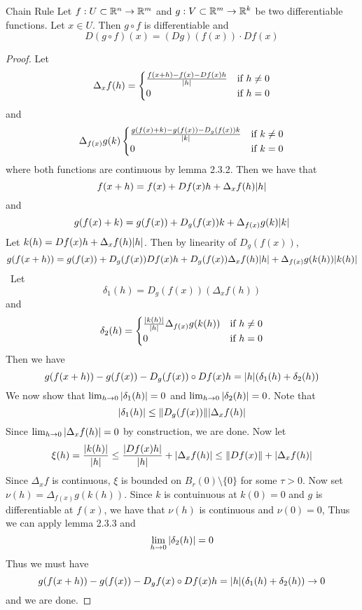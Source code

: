 \documentclass[a4paper]{article}
\begin{document}
\begin{prp}{Chain Rule}{} Let $f:U\subset\mathbb{R}^n\to\mathbb{R}^m$ and $g:V\subset\mathbb{R}^m\to\mathbb{R}^k$ be two differentiable functions. Let $x \in U$. Then $g\circ f$ is differentiable and $$D(g\circ f)(x)=(Dg)(f(x))\cdot Df(x)$$ 
\begin{proof}
Let $$\Delta_xf(h)=\begin{cases}
\frac{f(x+h)-f(x)-Df(x)h}{\abs{h}} & \text{if } h\neq 0\\
0 & \text{if } h=0
\end{cases}$$ and $$\Delta_{f(x)}g(k)\begin{cases}
\frac{g(f(x)+k)-g(f(x))-D_g(f(x))k}{\abs{k}} & \text{if } k\neq 0\\
0 & \text{if } k=0
\end{cases}$$ where both functions are continuous by lemma 2.3.2. Then we have that $$f(x+h)=f(x)+Df(x)h+\Delta_xf(h)\abs{h}$$ and $$g(f(x)+k)=g(f(x))+D_g(f(x))k+\Delta_{f(x)}g(k)\abs{k}$$ Let $k(h)=Df(x)h+\Delta_xf(h)\abs{h}$. Then by linearity of $D_g(f(x))$, $$g(f(x+h))=g(f(x))+D_g(f(x))Df(x)h+D_g(f(x))\Delta_xf(h)\abs{h}+\Delta_{f(x)}g(k(h))\abs{k(h)}$$\
Let $$\delta_1(h)=D_g(f(x))(\Delta_xf(h))$$ and $$\delta_2(h)=\begin{cases}
\frac{\abs{k(h)}}{\abs{h}}\Delta_{f(x)}g(k(h)) & \text{if }h\neq 0\\
0 & \text{if }h=0
\end{cases}$$
Then we have $$g(f(x+h))-g(f(x))-D_g(f(x))\circ Df(x)h=\abs{h}(\delta_1(h)+\delta_2(h))$$
\linebreak
We now show that $\lim_{h\to 0}\abs{\delta_1(h)}=0$ and $\lim_{h\to 0}\abs{\delta_2(h)}=0$. Note that $$\abs{\delta_1(h)}\leq\|D_g(f(x))\|\abs{\Delta_xf(h)}$$
Since $\lim_{h\to 0}\abs{\Delta_xf(h)}=0$ by construction, we are done. Now let $$\xi(h)=\frac{\abs{k(h)}}{\abs{h}}\leq\frac{\abs{Df(x)h}}{\abs{h}}+\abs{\Delta_xf(h)}\leq\|Df(x)\|+\abs{\Delta_xf(h)}$$ Since $\Delta_xf$ is continuous, $\xi$ is bounded on $B_r(0)\setminus\{0\}$ for some $\tau>0$. Now set $\nu(h)=\Delta_{f(x)}g(k(h))$. Since $k$ is contuinuous at $k(0)=0$ and $g$ is differentiable at $f(x)$, we have that $\nu(h)$ is continuous and $\nu(0)=0$, Thus we can apply lemma 2.3.3 and $$\lim_{h\to 0}\abs{\delta_2(h)}=0$$ Thus we must have $$g(f(x+h))-g(f(x))-D_gf(x)\circ Df(x)h=\abs{h}(\delta_1(h)+\delta_2(h))\to 0$$ and we are done. 
\end{proof}
\end{prp}
\end{document}
